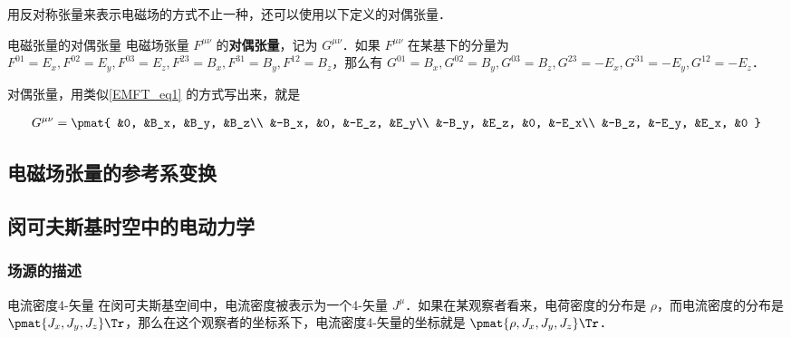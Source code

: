 用反对称张量来表示电磁场的方式不止一种，还可以使用以下定义的对偶张量．

\begin{definition}{电磁张量的对偶张量}
电磁场张量 $F^{\mu\nu}$ 的\textbf{对偶张量}，记为 $G^{\mu\nu}$．如果 $F^{\mu\nu}$ 在某基下的分量为 $F^{01}=E_x, F^{02}=E_y, F^{03}=E_z, F^{23}=B_x, F^{31}=B_y, F^{12}=B_z$，那么有 $G^{01}=B_x, G^{02}=B_y, G^{03}=B_z, G^{23}=-E_x, G^{31}=-E_y, G^{12}=-E_z$．
\end{definition}

对偶张量，用类似\autoref{EMFT_eq1} 的方式写出来，就是

\begin{equation}
\begin{aligned}
G^{\mu\nu}=
\pmat{
&0, &B_x, &B_y, &B_z\\ 
&-B_x, &0, &-E_z, &E_y\\ 
&-B_y, &E_z, &0, &-E_x\\
&-B_z, &-E_y, &E_x, &0
}
\end{aligned}
\end{equation}

\subsection{电磁场张量的参考系变换}


\subsection{闵可夫斯基时空中的电动力学}

\subsubsection{场源的描述}

\begin{definition}{电流密度4-矢量}
在闵可夫斯基空间中，电流密度被表示为一个4-矢量 $J^\mu$．如果在某观察者看来，电荷密度的分布是 $\rho$，而电流密度的分布是 $\pmat{J_x, J_y, J_z}\Tr$，那么在这个观察者的坐标系下，电流密度4-矢量的坐标就是 $\pmat{\rho, J_x, J_y, J_z}\Tr$．
\end{definition}

